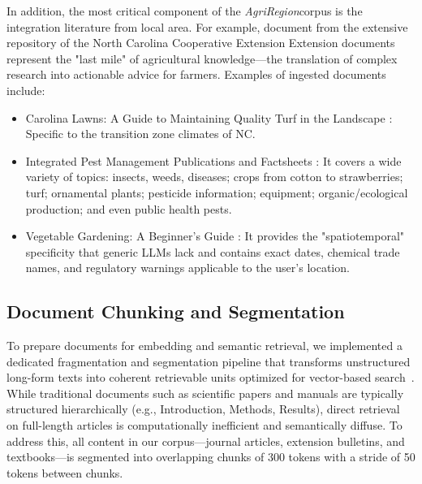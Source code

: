 \documentclass{ieeeaccess}
\newcommand{\AgriRegion}{\textit{AgriRegion}}
\begin{document}
In addition, the most critical component of the \AgriRegion corpus is the integration literature from local area. For example, document from the extensive repository of the North Carolina Cooperative Extension \cite{nc_cooperative_extension}
Extension documents represent the "last mile" of agricultural knowledge—the translation of complex research into actionable advice for farmers. Examples of ingested documents include:
\begin{itemize}
    \item Carolina Lawns: A Guide to Maintaining Quality Turf in the Landscape \cite{miller2021carolina}: Specific to the transition zone climates of NC.
    \item Integrated Pest Management Publications and Factsheets \cite{ncce_ipm_publications}: It covers a wide variety of topics: insects, weeds, diseases; crops from cotton to strawberries; turf; ornamental plants; pesticide information; equipment; organic/ecological production; and even public health pests.
    \item Vegetable Gardening: A Beginner's Guide \cite{ncce_2023_garden}: It provides the "spatiotemporal" specificity that generic LLMs lack and contains  exact dates, chemical trade names, and regulatory warnings applicable to the user's location.
    \end{itemize}



\subsection{Document Chunking and Segmentation}
To prepare documents for embedding and semantic retrieval, we implemented a dedicated fragmentation and segmentation pipeline that transforms unstructured long-form texts into coherent retrievable units optimized for vector-based search~\cite{lewis2020rag}. While traditional documents such as scientific papers and manuals are typically structured hierarchically (e.g., Introduction, Methods, Results), direct retrieval on full-length articles is computationally inefficient and semantically diffuse. To address this, all content in our corpus—journal articles, extension bulletins, and textbooks—is segmented into overlapping chunks of 300 tokens with a stride of 50 tokens between chunks. 
\end{document}
